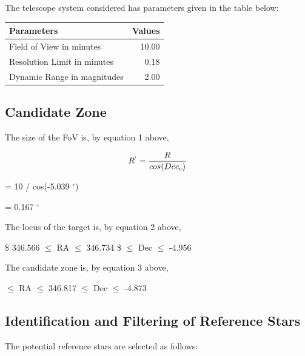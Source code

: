 \documentclass[]{elsarticle} %
\begin{document}
The telescope system considered has parameters given in the table below:

\begin{longtable}[]{@{}lr@{}}
\toprule
Parameters & Values\tabularnewline
\midrule
\endhead
Field of View in minutes & 10.00\tabularnewline
Resolution Limit in minutes & 0.18\tabularnewline
Dynamic Range in magnitudes & 2.00\tabularnewline
\bottomrule
\end{longtable}

\hypertarget{candidate-zone-1}{%
\subsection{Candidate Zone}\label{candidate-zone-1}}

The size of the FoV is, by equation 1 above,

\[R^` = {\frac{R}{cos(Dec_c)}}\]

\center = 10 / cos(-5.039 \(^{\circ}\)) \center

\center = 0.167 \(^{\circ}\) \center

The locus of the target is, by equation 2 above,

\center \$ 346.566 \(\leq\) RA \(\leq\) 346.734 \$ \center
{} \(\leq\) Dec \(\leq\) -4.956 \center

The candidate zone is, by equation 3 above,

 \(\leq\) RA \(\leq\) 346.817 \center {}
\(\leq\) Dec \(\leq\) -4.873 \center

\newpage

\hypertarget{identification-and-filtering-of-reference-stars-1}{%
\subsection{Identification and Filtering of Reference
Stars}\label{identification-and-filtering-of-reference-stars-1}}

The potential reference stars are selected as follows:
\end{document}
